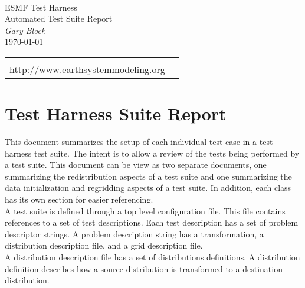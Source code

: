 \documentclass[english]{article}
\begin{document}
\begin{titlepage}
\begin{center}
\hspace{1in} \\
\vspace{1in}
{\Large ESMF Test Harness} \\
{\Large Automated Test Suite Report} \\
\medskip
{\it Gary Block} \\
\vspace{.5in}
{\large \today}
\end{center}

\vspace{4.0in}
\begin{tabular}{p{5in}p{.9in}}
\hrulefill \\
\noindent http://www.earthsystemmodeling.org \\
\end{tabular}

\end{titlepage}

\tableofcontents

\newpage

\section{Test Harness Suite Report}
This document summarizes the setup of each individual test case in a test harness test suite.  
The intent is to allow a review of the tests being performed by a test suite. 
This document can be view as two separate documents, one summarizing the redistribution aspects
of a test suite and one summarizing the data initialization and regridding aspects of a test suite.
In addition, each class has its own section for easier referencing.  \\

A test suite is defined through a top level configuration file.  
This file contains references to a set of test descriptions.  
Each test description has a set of problem descriptor strings.
A problem description string has a transformation, a distribution description file,
and a grid description file. \\

A distribution description file has a set of distributions definitions.
A distribution definition describes how a source distribution is transformed 
to a destination distribution. \\
\end{document}
